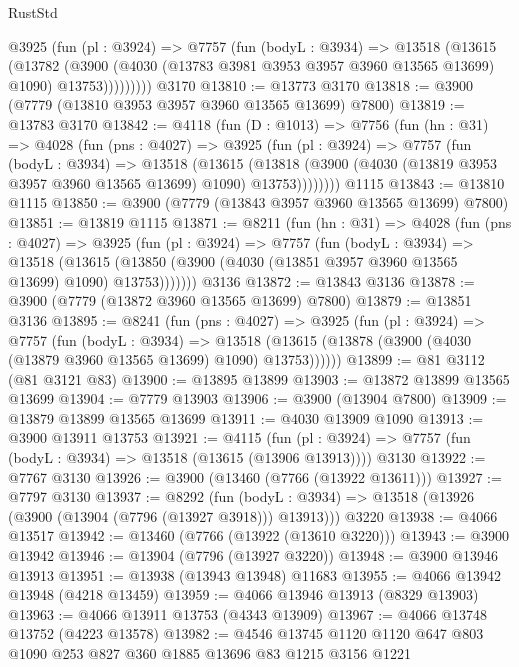 \begin{lexlean}{RustStd}
\begin{coremodule}
          @3925
            (fun (pl : @3924) =>
            @7757
              (fun (bodyL : @3934) =>
              @13518
                (@13615
                  (@13782
                    (@3900
                      (@4030 (@13783 @3981 @3953 @3957 @3960 @13565 @13699) @1090)
                      @13753)))))))))
    @3170
@13810 := @13773 @3170
@13818 := @3900 (@7779 (@13810 @3953 @3957 @3960 @13565 @13699) @7800)
@13819 := @13783 @3170
@13842 := @4118
    (fun (D : @1013) =>
    @7756
      (fun (hn : @31) =>
      @4028
        (fun (pns : @4027) =>
        @3925
          (fun (pl : @3924) =>
          @7757
            (fun (bodyL : @3934) =>
            @13518
              (@13615
                (@13818 (@3900 (@4030 (@13819 @3953 @3957 @3960 @13565 @13699) @1090) @13753))))))))
    @1115
@13843 := @13810 @1115
@13850 := @3900 (@7779 (@13843 @3957 @3960 @13565 @13699) @7800)
@13851 := @13819 @1115
@13871 := @8211
    (fun (hn : @31) =>
    @4028
      (fun (pns : @4027) =>
      @3925
        (fun (pl : @3924) =>
        @7757
          (fun (bodyL : @3934) =>
          @13518
            (@13615 (@13850 (@3900 (@4030 (@13851 @3957 @3960 @13565 @13699) @1090) @13753)))))))
    @3136
@13872 := @13843 @3136
@13878 := @3900 (@7779 (@13872 @3960 @13565 @13699) @7800)
@13879 := @13851 @3136
@13895 := @8241
    (fun (pns : @4027) =>
    @3925
      (fun (pl : @3924) =>
      @7757
        (fun (bodyL : @3934) =>
        @13518 (@13615 (@13878 (@3900 (@4030 (@13879 @3960 @13565 @13699) @1090) @13753))))))
@13899 := @81 @3112 (@81 @3121 @83)
@13900 := @13895 @13899
@13903 := @13872 @13899 @13565 @13699
@13904 := @7779 @13903
@13906 := @3900 (@13904 @7800)
@13909 := @13879 @13899 @13565 @13699
@13911 := @4030 @13909 @1090
@13913 := @3900 @13911 @13753
@13921 := @4115
    (fun (pl : @3924) => @7757 (fun (bodyL : @3934) => @13518 (@13615 (@13906 @13913))))
    @3130
@13922 := @7767 @3130
@13926 := @3900 (@13460 (@7766 (@13922 @13611)))
@13927 := @7797 @3130
@13937 := @8292
    (fun (bodyL : @3934) => @13518 (@13926 (@3900 (@13904 (@7796 (@13927 @3918))) @13913)))
    @3220
@13938 := @4066 @13517
@13942 := @13460 (@7766 (@13922 (@13610 @3220)))
@13943 := @3900 @13942
@13946 := @13904 (@7796 (@13927 @3220))
@13948 := @3900 @13946 @13913
@13951 := @13938 (@13943 @13948) @11683
@13955 := @4066 @13942 @13948 (@4218 @13459)
@13959 := @4066 @13946 @13913 (@8329 @13903)
@13963 := @4066 @13911 @13753 (@4343 @13909)
@13967 := @4066 @13748 @13752 (@4223 @13578)
@13982 := @4546 @13745 @1120 @1120 @647 @803 @1090 @253 @827 @360 @1885 @13696 @83 @1215 @3156 @1221

\end{coremodule}
\end{lexlean}
